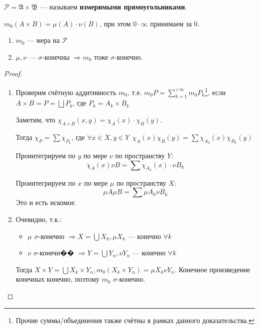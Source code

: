 \begin{obozn}
    \(\mathcal{P} = \mathfrak{A} \times \mathfrak{B}\) --- называем \textbf{измеримыми прямоугольниками}.

    \(m_0(A \times B) = \mu(A) \cdot \nu(B)\), при этом \(0 \cdot \infty\) принимаем за \(0\).
\end{obozn}
\begin{theorem}\itemfix
    \begin{enumerate}
        \item \(m_0\) --- мера на \(\mathcal{P}\)
        \item \(\mu, \nu\) --- \(\sigma\)-конечны \( \Rightarrow m_0\) тоже \(\sigma\)-конечно.
    \end{enumerate}
\end{theorem}
\begin{proof}\itemfix
    \begin{enumerate}
        \item Проверим счётную аддитивность \(m_0\), т.е. \(m_0 P = \sum_{k = 1}^{+\infty} m_0 P_k\)\footnote{Прочие суммы/объединения также счётны в рамках данного доказательства.}, если \(A \times B = P = \bigsqcup P_k\), где \(P_k = A_k \times B_k\)

              Заметим, что \(\chi_{A \times B}(x, y) = \chi_A(x) \cdot \chi_B(y)\).

              Тогда \(\chi_P = \sum \chi_{P_k}\), где \(\forall x\in X, y\in Y \ \ \chi_A(x) \chi_B(y) = \sum \chi_{A_k}(x) \chi_{B_k}(y)\)

              Проинтегрируем по \(y\) по мере \(\nu\) по пространству \(Y\):
              \[\chi_A(x) \nu B = \sum \chi_{A_k}(x) \cdot \nu B_k\]

              Проинтегрируем по \(x\) по мере \(\mu\) по пространству \(X\):
              \[\mu A \mu B = \sum \mu A_k \nu B_k\]
              Это и есть искомое.

        \item Очевидно, т.к.:
              \begin{itemize}
                  \item \(\mu\) \(\sigma\)-конечно \( \Rightarrow X = \bigcup X_k, \mu X_k\) --- конечно \(\forall k\)
                  \item \(\nu\) \(\sigma\)-конечн�� \( \Rightarrow Y = \bigcup Y_n, \nu Y_n\) --- конечно \(\forall k\)
              \end{itemize}

              Тогда \(X \times Y = \bigcup X_k \times Y_n, m_0(X_k \times Y_n) = \mu X_k \nu Y_n\). Конечное произведение конечных конечно, поэтому \(m_0\) \(\sigma\)-конечно.
    \end{enumerate}
\end{proof}

